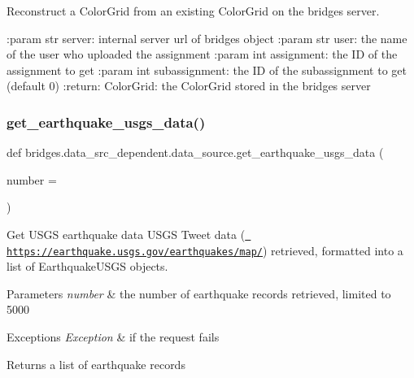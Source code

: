 Reconstruct a Color\+Grid from an existing Color\+Grid on the bridges server. 

\+:param str server\+: internal server url of bridges object \+:param str user\+: the name of the user who uploaded the assignment \+:param int assignment\+: the ID of the assignment to get \+:param int subassignment\+: the ID of the subassignment to get (default 0) \+:return\+: Color\+Grid\+: the Color\+Grid stored in the bridges server \mbox{\label{namespacebridges_1_1data__src__dependent_1_1data__source_a0d2a8b28fa0fa79440112d02ca9cd7fc}} 
\subsubsection{\texorpdfstring{get\_earthquake\_usgs\_data()}{get\_earthquake\_usgs\_data()}}
{\footnotesize\ttfamily def bridges.\+data\+\_\+src\+\_\+dependent.\+data\+\_\+source.\+get\+\_\+earthquake\+\_\+usgs\+\_\+data (\begin{DoxyParamCaption}\item[{}]{number = {} }\end{DoxyParamCaption})}



Get U\+S\+GS earthquake data U\+S\+GS Tweet data (\href{https://earthquake.usgs.gov/earthquakes/map/}{\texttt{ https\+://earthquake.\+usgs.\+gov/earthquakes/map/}}) retrieved, formatted into a list of Earthquake\+U\+S\+GS objects. 


\begin{DoxyParams}{Parameters}
{\em number} & the number of earthquake records retrieved, limited to 5000 \\
\hline
\end{DoxyParams}

\begin{DoxyExceptions}{Exceptions}
{\em Exception} & if the request fails\\
\hline
\end{DoxyExceptions}
\begin{DoxyReturn}{Returns}
a list of earthquake records 
\end{DoxyReturn}
\mbox{\label{namespacebridges_1_1data__src__dependent_1_1data__source_a31b64b8c7a42cdfca0a5f0ae3da187d2}} 
